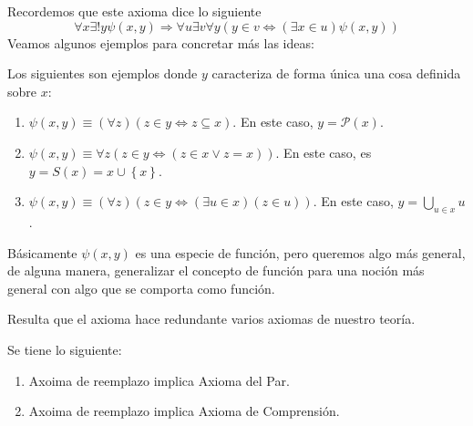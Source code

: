 \documentclass[12pt]{report}
\newcounter{it}
\theoremstyle{largebreak}
\newcommand\pot[1]{\ensuremath{\mathcal{P}\left(#1\right)}}
\begin{document}
    Recordemos que este axioma dice lo siguiente
    \begin{equation*}
        \forall x\exists!y\psi(x,y)\Rightarrow\forall u\exists v\forall y(y\in v\iff(\exists x\in u)\psi(x,y))
    \end{equation*}
    Veamos algunos ejemplos para concretar más las ideas:
    \begin{exa}
        Los siguientes son ejemplos donde $y$ caracteriza de forma única una cosa definida sobre $x$:
        \begin{enumerate}[label = \textit{(\arabic*)}]
            \item $\psi(x,y)\equiv(\forall z)(z\in y\iff z\subseteq x)$. En este caso, $y=\pot{x}$.
            \item $\psi(x,y)\equiv\forall z(z\in y\iff (z\in x\lor z=x))$. En este caso, es $y=S(x)=x\cup\left\{x\right\}$.
            \item $\psi(x,y)\equiv(\forall z)(z\in y\iff(\exists u\in x)(z\in u))$. En este caso, $y=\bigcup_{ u\in x}u$.
        \end{enumerate}
    \end{exa}

    Básicamente $\psi(x,y)$ es una especie de función, pero queremos algo más general, de alguna manera, generalizar el concepto de función para una noción más general con algo que se comporta como función.

    Resulta que el axioma hace redundante varios axiomas de nuestro teoría.

    \begin{obs}
        Se tiene lo siguiente:
        \begin{enumerate}[label = \textit{(\arabic*)}]
            \item Axoima de reemplazo implica Axioma del Par.
            \item Axoima de reemplazo implica Axioma de Comprensión.
        \end{enumerate}
    \end{obs}
\end{document}
